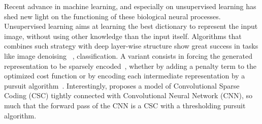 \documentclass[a4paper, 11pt, draft]{article} %
\begin{document}
Recent advance in machine learning, and especially on unsupervised learning has shed new light on the functioning of these biological neural processes.
Unsupervised learning aims at learning the best dictionary to represent the input image, without using other knowledge than the input itself. Algorithms that combines such strategy with deep layer-wise structure show great success in tasks like image denoising ~\citep{Vincent08}, classification. A variant consists in forcing the generated representation to be sparsely encoded~\citep{MakhzaniF13}, whether by adding a penalty term to the optimized cost function or by encoding each intermediate representation by a pursuit algorithm~\citep{Papyan16}. Interestingly, \citep{Papyan16} proposes a model of Convolutional Sparse Coding (CSC) tightly connected with Convolutional Neural Network (CNN), so much that the forward pass of the CNN is a CSC with a thresholding pursuit algorithm.
\end{document}
